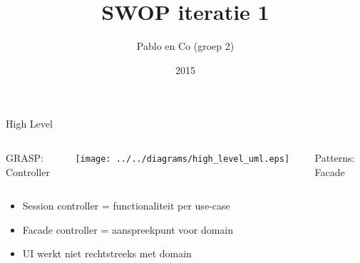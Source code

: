 \documentclass[mathserif,serif]{beamer}
\title{SWOP iteratie 1}
\author{Pablo en Co (groep 2)}
\institute{KU Leuven}
\date{2015}
\begin{document}
  \frame{\titlepage}

  \begin{frame}{High Level}
      \begin{columns}[c]
        \begin{column}{0.33\textwidth}
          \begin{center}
            GRASP:\\
            Controller
          \end{center}
        \end{column}
        \begin{column}{0.33\textwidth}
            \texttt{[image: ../../diagrams/high\_level\_uml.eps]}
        \end{column}
        \begin{column}{0.33\textwidth}
          \begin{center}
            Patterns:\\
            Facade
          \end{center}
        \end{column}
      \end{columns}
          \begin{center}
            \begin{itemize}
              \item Session controller = functionaliteit per use-case
              \item Facade controller = aanspreekpunt voor domain
              \item UI werkt niet rechtstreeks met domain
            \end{itemize}
          \end{center}
  \end{frame}
\end{document}
